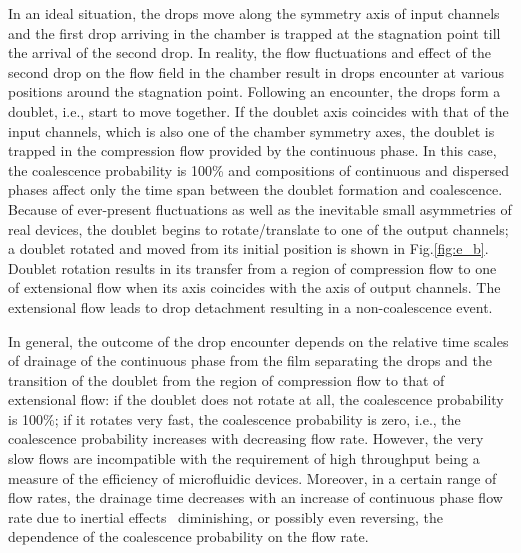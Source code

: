 \documentclass[twoside,twocolumn,9pt]{article}
\begin{document}
In an ideal situation, the drops move along the symmetry axis of input channels and the first drop arriving in the chamber is trapped at the stagnation point till the arrival of the second drop. In reality, the flow fluctuations and effect of the second drop on the flow field in the chamber result in drops encounter at various positions around the stagnation point. Following an encounter, the drops form a doublet, i.e., start to move together. If the doublet axis coincides with that of the input channels, which is also one of the chamber symmetry axes, the doublet is trapped in the compression flow provided by the continuous phase. In this case, the coalescence probability is 100\% and compositions of continuous and dispersed phases affect only the time span between the doublet formation and coalescence. Because of ever-present fluctuations as well as the inevitable small asymmetries of real devices, the doublet begins to rotate/translate to one of the output channels; a doublet rotated and moved from its initial position is shown in Fig.\ref{fig:e_b}. Doublet rotation results in its transfer from a region of compression flow to one of extensional flow when its axis coincides with the axis of output channels. The extensional flow leads to drop detachment resulting in a non-coalescence event. 

In general, the outcome of the drop encounter depends on the relative time scales of drainage of the continuous phase from the film separating the drops and the transition of the doublet from the region of compression flow to that of extensional flow: if the doublet does not rotate at all, the coalescence probability is 100\%; if it rotates very fast, the coalescence probability is zero, i.e., the coalescence probability increases with decreasing flow rate. However, the very slow flows are incompatible with  the  requirement of high throughput being a measure of the efficiency of microfluidic devices. Moreover, in a certain range of flow rates, the drainage time decreases with an increase of continuous phase flow rate due to inertial effects~\cite{yi2020efficient} diminishing, or possibly even reversing, the dependence of the coalescence probability on the flow rate. 

\end{document}
